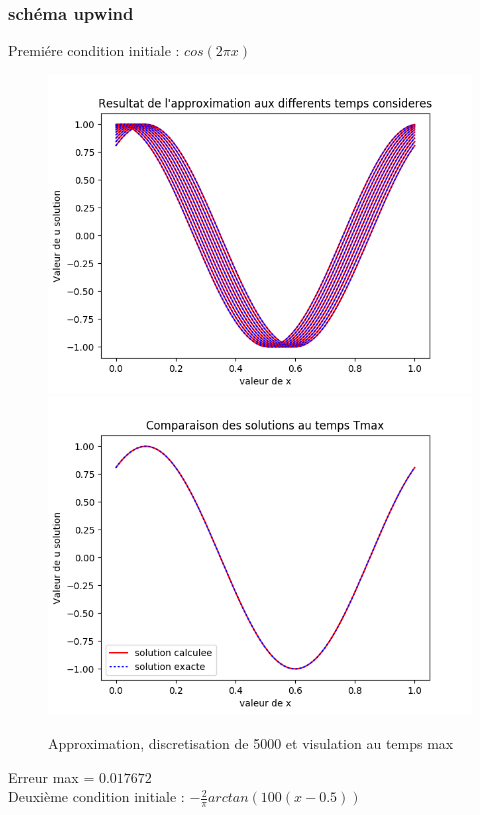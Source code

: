 \documentclass[12pt]{article}
\begin{document}
\subsubsection{schéma upwind}
Premiére condition initiale : $cos(2 \pi x)$
 \begin{figure}[H]
	\centering
	\includegraphics[scale=0.40]{1D_c1_5000_s1.png}
	\includegraphics[scale=0.40]{Temp_max_c1_5000_s1.png}
	\caption{Approximation, discretisation de 5000 et visulation au temps max}
	\label{1D} 
	\end{figure}
Erreur max = $0.017672$
\\Deuxième condition initiale : $-\frac{2}{\pi}arctan(100(x-0.5))$
\end{document}
